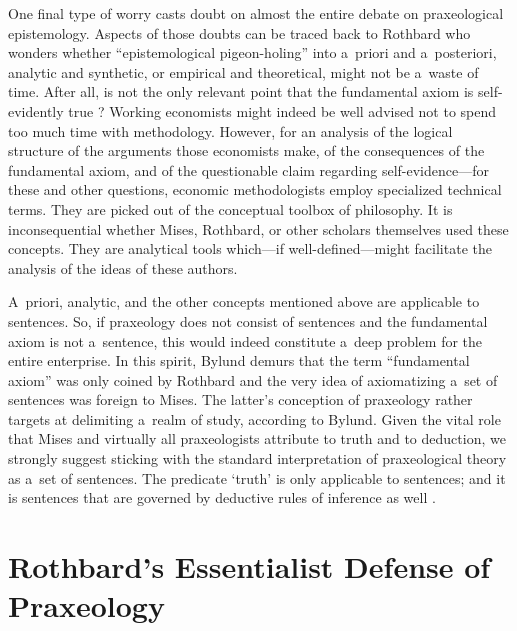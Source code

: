 One final type of worry casts doubt on almost the entire debate on praxeological epistemology. Aspects of those doubts can be traced back to Rothbard who wonders whether ``epistemological pigeon-holing'' into a~priori and a~posteriori, analytic and synthetic, or empirical and theoretical, might not be a~waste of time. After all, is not the only relevant point that the fundamental axiom is self-evidently true 
\parencite[see e.g.][p.318]{rothbard_defense_1957}? %
 Working economists might indeed be well advised not to spend too much time with methodology. However, for an analysis of the logical structure of the arguments those economists make, of the consequences of the fundamental axiom, and of the questionable claim regarding self-evidence---for these and other questions, economic methodologists employ specialized technical terms. They are picked out of the conceptual toolbox of philosophy. It is inconsequential whether Mises, Rothbard, or other scholars themselves used these concepts. They are analytical tools which---if well-defined---might facilitate the analysis of the ideas of these authors.



A~priori, analytic, and the other concepts mentioned above are applicable to sentences. So, if praxeology does not consist of sentences and the fundamental axiom is not a~sentence, this would indeed constitute a~deep problem for the entire enterprise. In this spirit, Bylund 
\parencite*[][]{bylund_alexander_2023} %
 demurs that the term ``fundamental axiom'' was only coined by Rothbard and the very idea of axiomatizing a~set of sentences was foreign to Mises. The latter's conception of praxeology rather targets at delimiting a~realm of study, according to Bylund. Given the vital role that Mises and virtually all praxeologists attribute to truth and to deduction, we strongly suggest sticking with the standard interpretation of praxeological theory as a~set of sentences. The predicate ‘truth' is only applicable to sentences; and it is sentences that are governed by deductive rules of inference as well 
\parencite[][]{linsbichler_ultra-refined_2023}.%




\section{Rothbard's Essentialist Defense of Praxeology}


